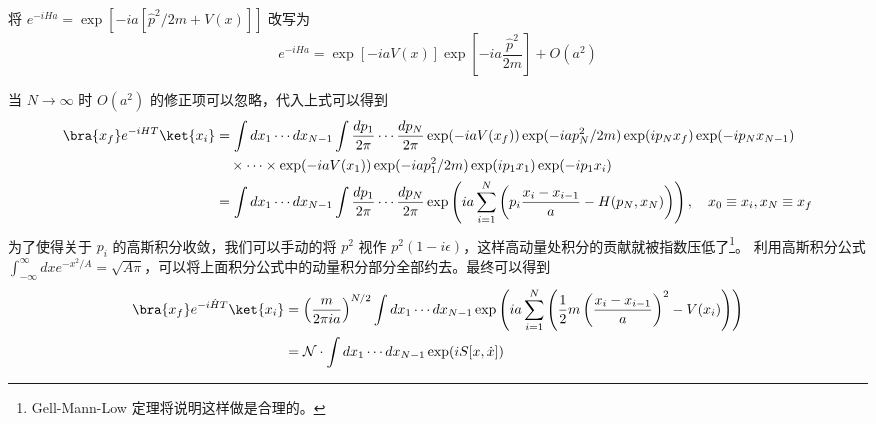 将 $e^{-iH a}=\exp[-ia[\hat p^2/2m + V(x)]]$ 改写为
\begin{equation}
        e^{-iH a}
        =\exp[-iaV(x)]\exp\left[-ia\frac{\hat p^2}{2m}\right]+O(a^2)
\end{equation}

当 $N\rightarrow \infty$ 时 $O(a^2)$ 的修正项可以忽略，代入上式可以得到
\begin{equation}
\begin{aligned}
        \bra{x_f}e^{-iHT}\ket{x_i}&=\int d x_1\cdots d x_{N-1}\int \frac{d p_1}{2\pi} \cdots \frac{d p_N}{2\pi}
        \exp(-iaV(x_f))\exp(-iap_N^2/2m) \exp(ip_Nx_f)\exp(-ip_N x_{N-1})
        \\
        &\quad \times \cdots \times 
        \exp(-iaV(x_1))\exp(-iap_1^2/2m) \exp(ip_1x_1)\exp(-ip_1 x_{i})
        \\
        &=\int d x_1\cdots d x_{N-1}\int \frac{d p_1}{2\pi} \cdots \frac{d p_N}{2\pi}
        \exp\left(ia\sum_{i=1}^N\left(p_i\frac{x_i-x_{i-1}}{a}-H(p_N,x_N) \right)\right),\quad x_0\equiv x_i,x_N\equiv x_f
\end{aligned}
\end{equation}
为了使得关于 $p_i$ 的高斯积分收敛，我们可以手动的将 $p^2$ 视作 $p^2(1-i\epsilon)$，这样高动量处积分的贡献就被指数压低了\footnote{Gell-Mann-Low 定理将说明这样做是合理的。}。
    利用高斯积分公式 $\int_{-\infty}^{\infty} dx e^{-x^2/A}=\sqrt{A\pi}$，可以将上面积分公式中的动量积分部分全部约去。最终可以得到
\begin{equation}
\begin{aligned}
        \bra{x_f}e^{-i\hat HT}\ket{x_i}&=
        \left(\frac{m}{2\pi i a}\right)^{N/2}
        \int d x_1\cdots d x_{N-1} 
        \exp\left( ia\sum_{i=1}^N \left( \frac{1}{2}m \left(\frac{x_i-x_{i-1}}{a}\right)^2 - V(x_i) \right) \right)
        \\
        &=\mathcal{N} \cdot 
        \int d x_1\cdots d x_{N-1} \exp(iS[x,\dot x])
\end{aligned}
\end{equation}
